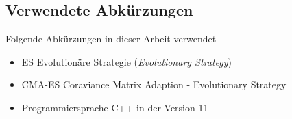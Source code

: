 \newpage
\subsection*{Verwendete Abkürzungen}
Folgende Abkürzungen in dieser Arbeit verwendet
\begin{itemize}
	\item	ES Evolutionäre Strategie (\textit{Evolutionary Strategy})
	\item	CMA-ES Coraviance Matrix Adaption - Evolutionary Strategy
	\item	{} Programmiersprache C++ in der Version 11
	
\end{itemize}